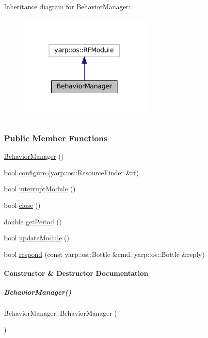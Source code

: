 Inheritance diagram for Behavior\+Manager\+:
\nopagebreak
\begin{figure}[H]
\begin{center}
\leavevmode
\includegraphics[width=189pt]{classBehaviorManager__inherit__graph}
\end{center}
\end{figure}
\subsubsection*{Public Member Functions}
\begin{DoxyCompactItemize}
\item 
\hyperlink{group__behaviorManager_aa699ec477e97bfc1088696ab605c3fcc}{Behavior\+Manager} ()
\item 
bool \hyperlink{group__behaviorManager_a862cc13dc0d23fdddafda20b98f965f9}{configure} (yarp\+::os\+::\+Resource\+Finder \&rf)
\item 
bool \hyperlink{group__behaviorManager_a892731d599c983a1a5b16d6fde6a1a38}{interrupt\+Module} ()
\item 
bool \hyperlink{group__behaviorManager_adb54b3d9d7627ae53f611e0e3bba2baa}{close} ()
\item 
double \hyperlink{group__behaviorManager_a29421476007fe6bfd5b3ee388e51fdaa}{get\+Period} ()
\item 
bool \hyperlink{group__behaviorManager_ad46e6bb61e754f6a33e73ac3ce656fbb}{update\+Module} ()
\item 
bool \hyperlink{group__behaviorManager_a79cbdf143299a44a1c391e385846bb04}{respond} (const yarp\+::os\+::\+Bottle \&cmd, yarp\+::os\+::\+Bottle \&reply)
\end{DoxyCompactItemize}


\paragraph{Constructor \& Destructor Documentation}
\mbox{\label{group__behaviorManager_aa699ec477e97bfc1088696ab605c3fcc}} 
\subparagraph{\texorpdfstring{Behavior\+Manager()}{BehaviorManager()}}
{\footnotesize\ttfamily Behavior\+Manager\+::\+Behavior\+Manager (\begin{DoxyParamCaption}{ }\end{DoxyParamCaption})\hspace{0.3cm}{\ttfamily [inline]}}



